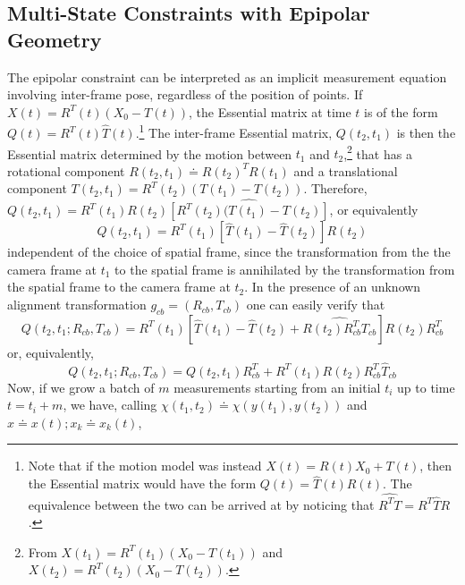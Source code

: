 \documentclass[]{article}
\begin{document}

\subsection{Multi-State Constraints with Epipolar Geometry}

The epipolar constraint can be interpreted as an implicit measurement equation involving inter-frame pose, regardless of the position of points. If $X(t) = R^T(t) (X_0 - T(t))$, the Essential matrix at time $t$ is of the form $Q(t) = R^T(t)\widehat T(t)$.\footnote{Note that if the motion model was instead $X(t) = R(t)X_0 + T(t)$, then the Essential matrix would have the form $Q(t) = \widehat T(t) R(t)$. The equivalence between the two can be arrived at by noticing that $\widehat{R^T T} = R^T \widehat T  R$.} The inter-frame Essential matrix, $Q(t_2, t_1)$ is then the Essential matrix determined by the motion between $t_1$ and $t_2$,\footnote{From $X(t_1) = R^T(t_1)(X_0 - T(t_1))$ and $X(t_2) = R^T(t_2)(X_0 - T(t_2))$.} that has a rotational component $R(t_2, t_1) \doteq R(t_2)^TR(t_1)$ and a translational component $T(t_2, t_1) = R^T(t_2)(T(t_1) - T(t_2))$. Therefore, $Q(t_2, t_1) = R^T(t_1)R(t_2)\widehat{[R^T(t_2)(T(t_1)-T(t_2)]}$, or equivalently
\begin{equation}
Q(t_2, t_1) = R^T(t_1)[\widehat T(t_1)- \widehat T(t_2)]R(t_2)
\end{equation}
independent of the choice of spatial frame, since the transformation from the the camera frame at $t_1$ to the spatial frame is annihilated by the transformation from the spatial frame to the camera frame at $t_2$. In the presence of an unknown alignment transformation $g_{cb} = (R_{cb}, T_{cb})$ one can easily verify that
\begin{equation}
Q(t_2, t_1; R_{cb}, T_{cb}) = R^T(t_1)[\widehat T(t_1)- \widehat T(t_2) + \widehat{R(t_2) R_{cb}^T T_{cb}}]R(t_2)R_{cb}^T
\end{equation}
or, equivalently, 
\begin{equation}
Q(t_2, t_1; R_{cb}, T_{cb}) = Q(t_2, t_1) R_{cb}^T + R^T(t_1)R(t_2) R_{cb}^T \widehat T_{cb}
\end{equation}
Now, if we grow a batch of $m$ measurements starting from an initial $t_i$ up to time $t = t_i + m$, we have, calling $\chi(t_1, t_2) \doteq \chi(y(t_1), y(t_2))$ and $x \doteq x(t); x_k \doteq x_k(t)$, 
\end{document}
